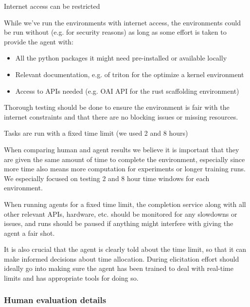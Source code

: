 \documentclass[
]{article}
\providecommand{\tightlist}{%
  \setlength{\itemsep}{0pt}\setlength{\parskip}{0pt}}
\begin{document}
{}

{Internet access can be restricted}

{While we've run the environments with internet access, the environments
could be run without (e.g. for security reasons) as long as some effort
is taken to provide the agent with:}

\begin{itemize}
\tightlist
\item
  {All the python packages it might need pre-installed or available
  locally}
\item
  {Relevant documentation, e.g. of triton for the optimize a kernel
  environment}
\item
  {Access to APIs needed (e.g. OAI API for the rust scaffolding
  environment)}
\end{itemize}

{Thorough testing should be done to ensure the environment is fair with
the internet constraints and that there are no blocking issues or
missing resources. }

{}

{Tasks are run with a fixed time limit (we used 2 and 8 hours)}

{When comparing human and agent results we believe it is important that
they are given the same amount of time to complete the environment,
especially since more time also means more computation for experiments
or longer training runs. We especially focused on testing 2 and 8 hour
time windows for each environment. }

{}

{When running agents for a fixed time limit, the completion service
along with all other relevant APIs, hardware, etc. should be monitored
for any slowdowns or issues, and runs should be paused if anything might
interfere with giving the agent a fair shot. }

{}

{It is also crucial that the agent is clearly told about the time limit,
so that it can make informed decisions about time allocation. During
elicitation effort should ideally go into making sure the agent has been
trained to deal with real-time limits and has appropriate tools for
doing so.}

\label{id.8pq05zvq0s9j}{}

\subsubsection{\texorpdfstring{{Human evaluation
details}}{Human evaluation details}}\label{h.e32gj9bjz9hr}
\end{document}
